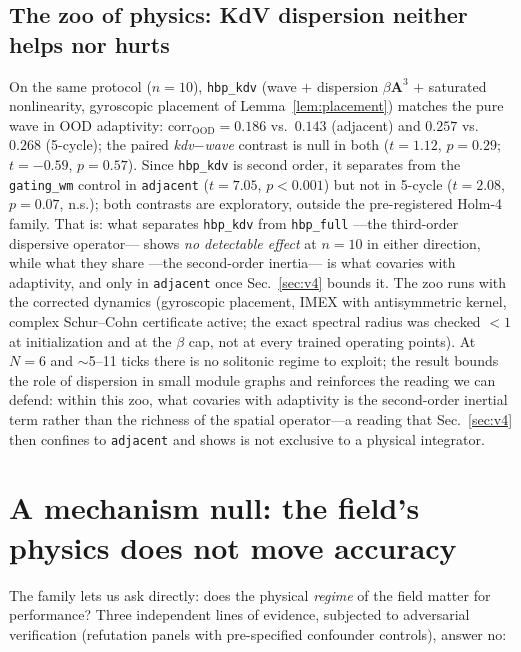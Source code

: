 \documentclass{article}
\begin{document}
\subsection{The zoo of physics: KdV dispersion neither helps nor hurts}
On the same protocol ($n{=}10$), \texttt{hbp\_kdv} (wave $+$ dispersion
$\beta\mathbf{A}^3$ $+$ saturated nonlinearity, gyroscopic placement of
Lemma~\ref{lem:placement}) matches the pure wave in OOD adaptivity:
$\mathrm{corr}_{\mathrm{OOD}}=0.186$ vs.\ $0.143$ (adjacent) and $0.257$ vs.\
$0.268$ (5-cycle); the paired \emph{kdv$-$wave} contrast is null in both
($t{=}1.12$, $p{=}0.29$; $t{=}{-}0.59$, $p{=}0.57$). Since \texttt{hbp\_kdv} is
second order, it separates from the
\texttt{gating\_wm} control in \texttt{adjacent} ($t{=}7.05$, $p{<}0.001$) but
not in 5-cycle ($t{=}2.08$, $p{=}0.07$, n.s.); both contrasts are exploratory,
outside the pre-registered Holm-4 family. That is: what separates
\texttt{hbp\_kdv} from \texttt{hbp\_full} ---the third-order dispersive
operator--- shows \emph{no detectable effect} at $n{=}10$ in either direction,
while what they share ---the second-order inertia--- is what covaries with
adaptivity, and only in \texttt{adjacent} once Sec.~\ref{sec:v4} bounds it. The zoo runs with the
corrected dynamics (gyroscopic placement, IMEX with antisymmetric kernel,
complex Schur--Cohn certificate active; the exact spectral radius was checked
$<1$ at initialization and at the $\beta$ cap, not at every trained
operating points). At $N{=}6$ and $\sim$5--11 ticks there is no solitonic regime
to exploit; the result bounds the role of dispersion in small module graphs and
reinforces the reading we can defend: within this zoo, what covaries with
adaptivity is the second-order inertial term rather than the richness of the
spatial operator---a reading that Sec.~\ref{sec:v4} then confines to
\texttt{adjacent} and shows is not exclusive to a physical integrator.

\section{A mechanism null: the field's physics does not move accuracy}
\label{sec:null}

The family lets us ask directly: does the physical \emph{regime} of the field
matter for performance? Three independent lines of evidence, subjected to
adversarial verification (refutation panels with pre-specified confounder
controls), answer no:
\end{document}
